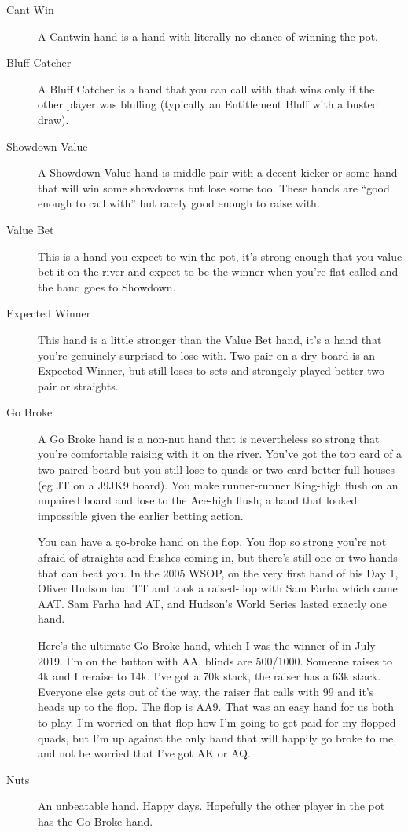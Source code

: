 \begin{description}

\item[Cant Win] A Cantwin hand is a hand with literally no chance of
winning the pot.

\item[Bluff Catcher] A Bluff Catcher is a hand that you can call with
that wins only if the other player was bluffing (typically an
Entitlement Bluff with a busted draw).

\item[Showdown Value] A Showdown Value hand is middle pair with a
decent kicker or some hand that will win some showdowns but lose some
too. These hands are ``good enough to call with'' but rarely good
enough to raise with.

\item[Value Bet] This is a hand you expect to win the pot, it's strong
enough that you value bet it on the river and expect to be the winner
when you're flat called and the hand goes to Showdown.

\item[Expected Winner] This hand is a little stronger than the Value
Bet hand, it's a hand that you're genuinely surprised to lose
with. Two pair on a dry board is an Expected Winner, but still loses
to sets and strangely played better two-pair or straights.

\item[Go Broke] A Go Broke hand is a non-nut hand that is nevertheless
so strong that you're comfortable raising with it on the river. You've
got the top card of a two-paired board but you still lose to quads or
two card better full houses (eg JT on a J9JK9 board). You make
runner-runner King-high flush on an unpaired board and lose to the
Ace-high flush, a hand that looked impossible given the earlier
betting action.

You can have a go-broke hand on the flop. You flop so strong you're
not afraid of straights and flushes coming in, but there's still one
or two hands that can beat you. In the 2005 WSOP, on the very first
hand of his Day 1, Oliver Hudson had TT and took a raised-flop with
Sam Farha which came AAT. Sam Farha had AT, and Hudson's World Series
lasted exactly one hand.

Here's the ultimate Go Broke hand, which I was the winner of in July 2019.
I'm on the button with AA, blinds are 500/1000. Someone raises to 4k and
I reraise to 14k. I've got a 70k stack, the raiser has a 63k stack.
Everyone else gets out of the way, the raiser flat calls with 99
and it's heads up to the flop. The flop is AA9. That was an easy hand
for us both to play. I'm worried on that flop how I'm going to get
paid for my flopped quads, but I'm up against the only hand that will
happily go broke to me, and not be worried that I've got AK or AQ.

\item[Nuts] An unbeatable hand. Happy days. Hopefully the other player
in the pot has the Go Broke hand.

\end{description}

